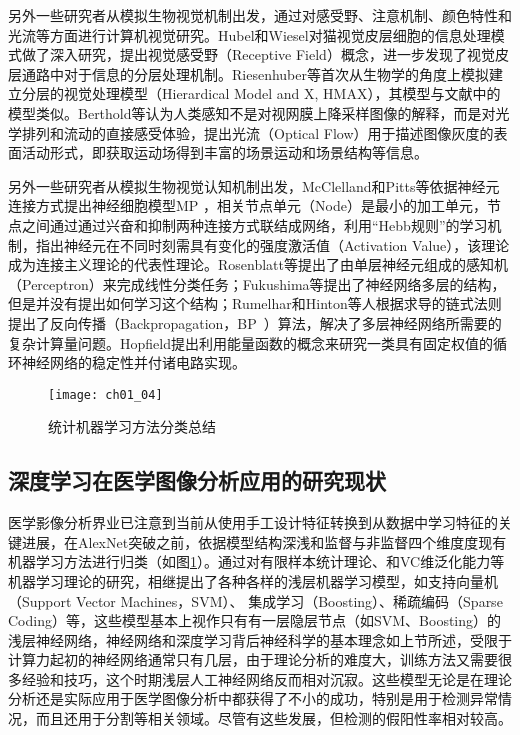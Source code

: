 另外一些研究者从模拟生物视觉机制出发，通过对感受野、注意机制、颜色特性和光流等方面进行计算机视觉研究。Hubel和Wiesel\citep{Hubel1962Receptive}对猫视觉皮层细胞的信息处理模式做了深入研究，提出视觉感受野（Receptive Field）概念，进一步发现了视觉皮层通路中对于信息的分层处理机制。Riesenhuber等\citep{Riesenhuber1999}首次从生物学的角度上模拟建立分层的视觉处理模型（Hierardical Model and X, HMAX），其模型与文献中的模型类似。Berthold等\citep{Horn1981}认为人类感知不是对视网膜上降采样图像的解释，而是对光学排列和流动的直接感受体验，提出光流（Optical Flow）用于描述图像灰度的表面活动形式，即获取运动场得到丰富的场景运动和场景结构等信息。

另外一些研究者从模拟生物视觉认知机制出发，McClelland和Pitts等依据神经元连接方式提出神经细胞模型MP ，相关节点单元（Node）是最小的加工单元，节点之间通过通过兴奋和抑制两种连接方式联结成网络，利用“Hebb规则”的学习机制，指出神经元在不同时刻需具有变化的强度激活值（Activation Value），该理论成为连接主义理论的代表性理论。Rosenblatt等\citep{Rosenblatt1958}提出了由单层神经元组成的感知机（Perceptron）来完成线性分类任务；Fukushima等\citep{Fukushima1982Neocognitron}提出了神经网络多层的结构，但是并没有提出如何学习这个结构；Rumelhar和Hinton等人\citep{Rumelhart1988Learning}根据求导的链式法则提出了反向传播（Backpropagation，BP ）算法，解决了多层神经网络所需要的复杂计算量问题。Hopfield提出利用能量函数的概念来研究一类具有固定权值的循环神经网络的稳定性并付诸电路实现。

\begin{figure}[!htbp]
    \centering
    \texttt{[image: ch01\_04]}
    \caption{统计机器学习方法分类总结}
    \label{fig:ch01_04}
\end{figure}

\subsection{深度学习在医学图像分析应用的研究现状}


医学影像分析界业已注意到当前从使用手工设计特征转换到从数据中学习特征的关键进展，在AlexNet突破之前，依据模型结构深浅和监督与非监督四个维度度现有机器学习方法进行归类（如图\ref{fig:ch01_04}）。通过对有限样本统计理论、和VC维泛化能力等机器学习理论的研究，相继提出了各种各样的浅层机器学习模型，如支持向量机（Support Vector Machines，SVM）、 集成学习（Boosting）、稀疏编码（Sparse Coding）等，这些模型基本上视作只有有一层隐层节点（如SVM、Boosting）的浅层神经网络，神经网络和深度学习背后神经科学的基本理念如上节所述，受限于计算力起初的神经网络通常只有几层，由于理论分析的难度大，训练方法又需要很多经验和技巧，这个时期浅层人工神经网络反而相对沉寂。这些模型无论是在理论分析还是实际应用于医学图像分析中都获得了不小的成功，特别是用于检测异常情况，而且还用于分割等相关领域。尽管有这些发展，但检测的假阳性率相对较高。


